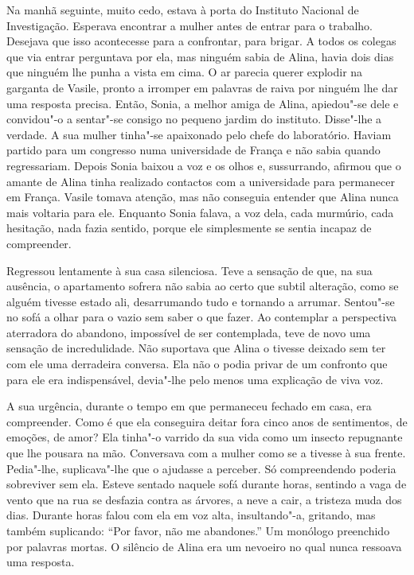 Na manhã seguinte, muito cedo, estava à porta do Instituto Nacional de
Investigação. Esperava encontrar a mulher antes de entrar para o
trabalho. Desejava que isso acontecesse para a confrontar, para brigar.
A todos os colegas que via entrar perguntava por ela, mas ninguém sabia
de Alina, havia dois dias que ninguém lhe punha a vista em cima. O ar
parecia querer explodir na garganta de Vasile, pronto a irromper em
palavras de raiva por ninguém lhe dar uma resposta precisa. Então,
Sonia, a melhor amiga de Alina, apiedou"-se dele e convidou"-o a sentar"-se
consigo no pequeno jardim do instituto. Disse"-lhe a verdade. A sua
mulher tinha"-se apaixonado pelo chefe do laboratório. Haviam partido
para um congresso numa universidade de França e não sabia quando
regressariam. Depois Sonia baixou a voz e os olhos e, sussurrando, afirmou que o amante de Alina tinha realizado contactos com a universidade
para permanecer em França. Vasile tomava atenção, mas não conseguia
entender que Alina nunca mais voltaria para ele. Enquanto Sonia falava,
a voz dela, cada murmúrio, cada hesitação, nada fazia sentido, porque
ele simplesmente se sentia incapaz de compreender.

Regressou lentamente à sua casa silenciosa. Teve a sensação de que, na sua ausência, o apartamento sofrera não sabia ao certo
que subtil alteração, como se alguém tivesse estado ali, desarrumando
tudo e tornando a arrumar. Sentou"-se no sofá a olhar para o vazio sem
saber o que fazer. Ao contemplar a perspectiva aterradora do abandono,
impossível de ser contemplada, teve de novo uma
sensação de incredulidade. Não suportava que Alina o tivesse deixado sem
ter com ele uma derradeira conversa. Ela não o podia privar de um
confronto que para ele era indispensável, devia"-lhe pelo menos uma
explicação de viva voz.

A sua urgência, durante o tempo em que permaneceu fechado em casa, era
compreender. Como é que ela conseguira deitar fora cinco anos de
sentimentos, de emoções, de amor? Ela tinha"-o varrido da sua vida como
um insecto repugnante que lhe pousara na mão. Conversava com a mulher
como se a tivesse à sua frente. Pedia"-lhe, suplicava"-lhe que o ajudasse a perceber. Só compreendendo poderia sobreviver sem
ela. Esteve sentado naquele sofá durante horas, sentindo a vaga de vento
que na rua se desfazia contra as árvores, a neve a cair, a tristeza muda
dos dias. Durante horas falou com ela em voz alta, insultando"-a,
gritando, mas também suplicando: ``Por favor, não me abandones.'' Um
monólogo preenchido por palavras mortas. O silêncio de Alina era um
nevoeiro no qual nunca ressoava uma resposta.


